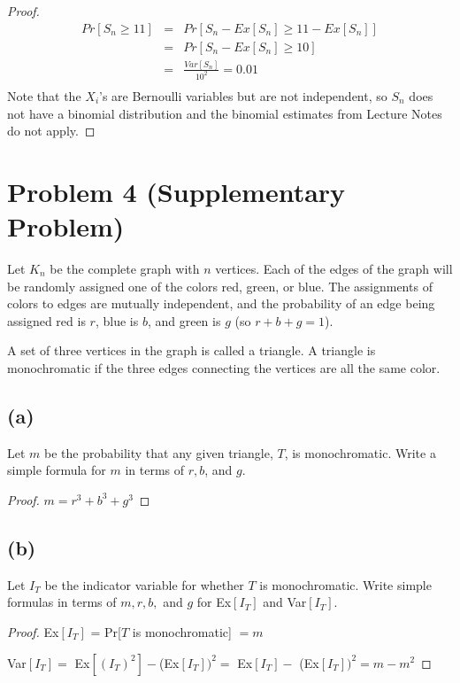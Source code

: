 \documentclass[14pt]{extarticle}
\newcommand{\dps}{\displaystyle}
\begin{document}
\begin{proof}
$$
\begin{array}{rcl}
Pr[S_n \geq 11] & = & Pr[S_n - Ex[S_n] \geq 11 - Ex[S_n]]\\
& = & Pr[S_n - Ex[S_n] \geq 10]\\
& = & \dps \frac{Var[S_n]}{10^2} = 0.01\\
\end{array}
$$
Note that the $X_i$’s are Bernoulli variables but are not independent, so $S_n$ does not have a binomial distribution and the binomial estimates from Lecture Notes do not apply.
\end{proof}

\section{Problem 4 (Supplementary Problem)}
Let $K_n$ be the complete graph with $n$ vertices. Each of the edges of the graph will be randomly assigned one of the colors red, green, or blue. The assignments of colors to edges are mutually independent, and the probability of an edge being assigned red is $r$, blue is $b$, and green is $g$ (so $r + b + g = 1$).

A set of three vertices in the graph is called a triangle. A triangle is monochromatic if the three edges connecting the vertices are all the same color.

\subsection{(a)}
Let $m$ be the probability that any given triangle, $T$, is monochromatic. Write a simple formula for $m$ in terms of $r, b$, and $g$.

\begin{proof}
$m = r^3 + b^3 + g^3$
\end{proof}

\subsection{(b)}
Let $I_T$ be the indicator variable for whether $T$ is monochromatic. Write simple formulas in terms of $m, r, b,$ and $g$ for Ex$[I_T]$ and Var$[I_T]$.

\begin{proof}
Ex$[I_T]$ = Pr[$T$ is monochromatic] $= m$

Var$[I_T] = $ Ex$[(I_T)^2] - $(Ex$[I_T])^2 =$ Ex$[I_T] - $ (Ex$[I_T])^2 = m - m^2$
\end{proof}
\end{document}
